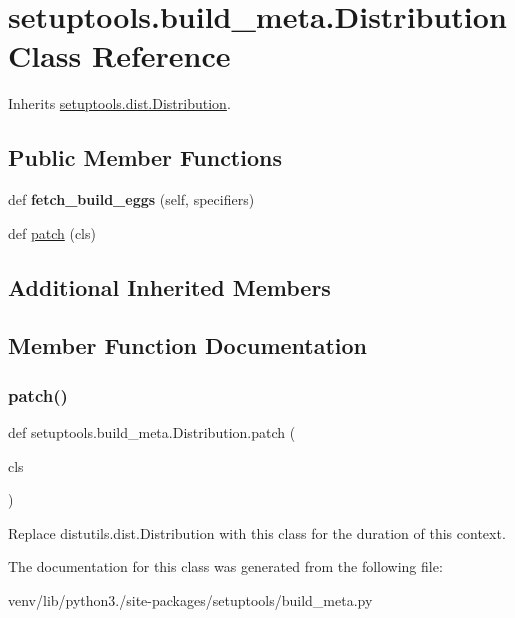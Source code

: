 \hypertarget{classsetuptools_1_1build__meta_1_1_distribution}{}\section{setuptools.\+build\+\_\+meta.\+Distribution Class Reference}
\label{classsetuptools_1_1build__meta_1_1_distribution}


Inherits \hyperlink{classsetuptools_1_1dist_1_1_distribution}{setuptools.\+dist.\+Distribution}.

\subsection*{Public Member Functions}
\begin{DoxyCompactItemize}
\item 
\mbox{\label{classsetuptools_1_1build__meta_1_1_distribution_a0750a768f6ccf6b86bf22d5d9c54c5c8}} 
def {\bfseries fetch\+\_\+build\+\_\+eggs} (self, specifiers)
\item 
def \hyperlink{classsetuptools_1_1build__meta_1_1_distribution_aa2e373f39d117468118173896e4695b5}{patch} (cls)
\end{DoxyCompactItemize}
\subsection*{Additional Inherited Members}


\subsection{Member Function Documentation}
\mbox{\label{classsetuptools_1_1build__meta_1_1_distribution_aa2e373f39d117468118173896e4695b5}} 
\subsubsection{\texorpdfstring{patch()}{patch()}}
{\footnotesize\ttfamily def setuptools.\+build\+\_\+meta.\+Distribution.\+patch (\begin{DoxyParamCaption}\item[{}]{cls }\end{DoxyParamCaption})}

\begin{DoxyVerb}Replace
distutils.dist.Distribution with this class
for the duration of this context.
\end{DoxyVerb}
 

The documentation for this class was generated from the following file\+:\begin{DoxyCompactItemize}
\item 
venv/lib/python3./site-\/packages/setuptools/build\+\_\+meta.\+py\end{DoxyCompactItemize}
